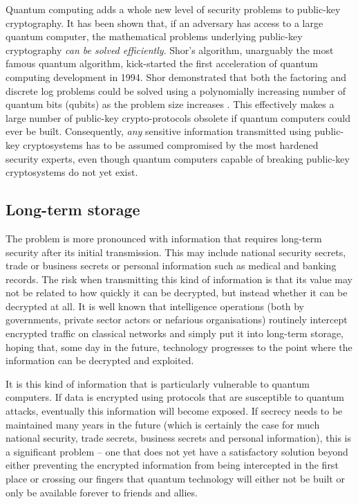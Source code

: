 \documentclass[twocolumn, aps, rmp, amsmath, amssymb, nofootinbib, superscriptaddress, longbibliography, floatfix, table-of-contents, eqsecnum]{revtex4-2}
\begin{document}
Quantum computing adds a whole new level of security problems to public-key cryptography. It has been shown that, if an adversary has access to a large quantum computer, the mathematical problems underlying public-key cryptography \textit{can be solved efficiently}. Shor's algorithm, unarguably the most famous quantum algorithm, kick-started the first acceleration of quantum computing development in 1994. Shor demonstrated that both the factoring and discrete log problems could be solved using a polynomially increasing number of quantum bits (qubits) as the problem size increases \cite{?}. This effectively makes a large number of public-key crypto-protocols obsolete if quantum computers could ever be built. Consequently, \textit{any} sensitive information transmitted using public-key cryptosystems has to be assumed compromised by the most hardened security experts, even though quantum computers capable of breaking public-key cryptosystems do not yet exist. 

\subsection{Long-term storage}

The problem is more pronounced with information that requires long-term security after its initial transmission. This may include national security secrets, trade or business secrets or personal information such as medical and banking records. The risk when transmitting this kind of information is that its value may not be related to how quickly it can be decrypted, but instead whether it can be decrypted at all. It is well known that intelligence operations (both by governments, private sector actors or nefarious organisations) routinely intercept encrypted traffic on classical networks and simply put it into long-term storage, hoping that, some day in the future, technology progresses to the point where the information can be decrypted and exploited. 

It is this kind of information that is particularly vulnerable to quantum computers. If data is encrypted using protocols that are susceptible to quantum attacks, eventually this information will become exposed. If secrecy needs to be maintained many years in the future (which is certainly the case for much national security, trade secrets, business secrets and personal information), this is a significant problem -- one that does not yet have a satisfactory solution beyond either preventing the encrypted information from being intercepted in the first place or crossing our fingers that quantum technology will either not be built or only be available forever to friends and allies. 
\end{document}
